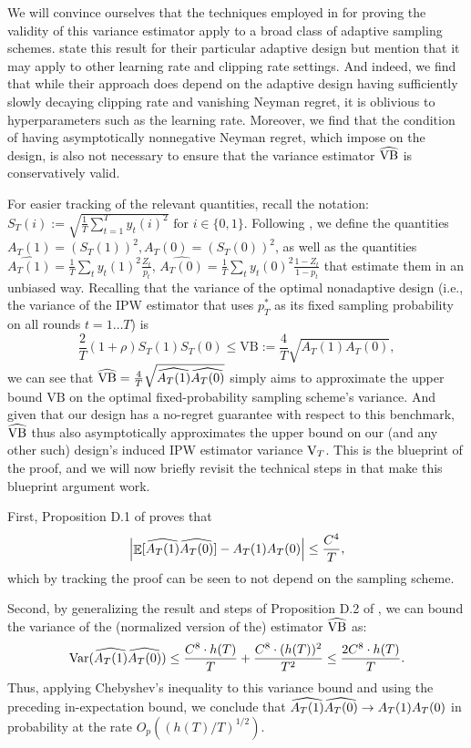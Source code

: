 We will convince ourselves that the techniques employed in \citet{dai2023clip} for proving the validity of this variance estimator apply to a broad class of adaptive sampling schemes. \citet{dai2023clip} state this result for their particular adaptive design but mention that it may apply to other learning rate and clipping rate settings. And indeed, we find that while their approach does depend on the adaptive design having sufficiently slowly decaying clipping rate and vanishing Neyman regret, it is oblivious to hyperparameters such as the learning rate. Moreover, we find that the condition of having asymptotically nonnegative Neyman regret, which \citet{dai2023clip} impose on the design, is also not necessary to ensure that the variance estimator $\widehat{\mathrm{VB}}$ is conservatively valid.

For easier tracking of the relevant quantities, recall the notation: $S_T(i) := \sqrt{\frac{1}{T} \sum_{t=1}^T y_t(i)^2} \text{ for } i \in \{0, 1\}.$ Following \citep{dai2023clip}, we define the quantities $A_T(1) = (S_T(1))^2, A_T(0) = (S_T(0))^2$, as well as the quantities $\widehat{A_T(1)} = \frac{1}{T} \sum_t y_t(1)^2 \frac{Z_t}{p_t}$, $\widehat{A_T(0)} = \frac{1}{T} \sum_t y_t(0)^2 \frac{1-Z_t}{1 - p_t}$ that estimate them in an unbiased way. Recalling that the variance of the optimal nonadaptive design (i.e., the variance of the IPW estimator that uses $p^*_T$ as its fixed sampling probability on all rounds $t=1\ldots T$) is \[ \frac{2}{T} (1+\rho) S_T(1) S_T(0) \leq \mathrm{VB} := \frac{4}{T} \sqrt{A_T(1) A_T(0)},\] we can see that $\widehat{\mathrm{VB}} = \frac{4}{T} \sqrt{\widehat{A_T(1)} \widehat{A_T(0)}}$ simply aims to approximate the upper bound $\mathrm{VB}$ on the optimal fixed-probability sampling scheme's variance. And given that our design has a no-regret guarantee with respect to this benchmark, $\widehat{\mathrm{VB}}$ thus also asymptotically approximates the upper bound on our (and any other such) design's induced IPW estimator variance $\mathrm{V}_T$. This is the blueprint of the proof, and we will now briefly revisit the technical steps in \citet{dai2023clip} that make this blueprint argument work.

    First, Proposition D.1 of \citet{dai2023clip} proves that
    \[
    \left| \mathop{\mathbb{E}}[\widehat{A_T(1)} \widehat{A_T(0)}] - A_T(1) A_T(0) \right| \leq \frac{C^4}{T},
    \]
    which by tracking the proof can be seen to not depend on the sampling scheme.

    Second, by generalizing the result and steps of Proposition D.2 of \citet{dai2023clip}, we can bound the variance of the (normalized version of the) estimator $\widehat{\mathrm{VB}}$ as:
    \[
    \mathop{\mathrm{Var}}(\widehat{A_T(1)} \widehat{A_T(0)}) \leq \frac{C^8 \cdot h(T)}{T} + \frac{C^8 \cdot (h(T))^2}{T^2} \leq \frac{2 C^8 \cdot h(T)}{T}.
    \]
    Thus, applying Chebyshev's inequality to this variance bound and using the preceding in-expectation bound, we conclude that $\widehat{A_T(1)} \widehat{A_T(0)} \to A_T(1) A_T(0)$ in probability at the rate $O_p((h(T)/T)^{1/2})$.

